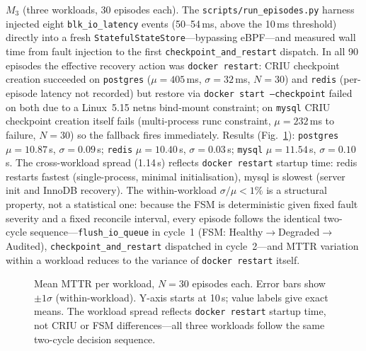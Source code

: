 \documentclass[conference]{IEEEtran}
\begin{document}
$M_3$ (three workloads, 30 episodes each). The \texttt{scripts/run\_episodes.py} harness injected eight \texttt{blk\_io\_latency} events (50--54\,ms, above the 10\,ms threshold) directly into a fresh \texttt{StatefulStateStore}---bypassing eBPF---and measured wall time from fault injection to the first \texttt{checkpoint\_and\_restart} dispatch. In all 90 episodes the effective recovery action was \texttt{docker restart}: CRIU checkpoint creation succeeded on \texttt{postgres} ($\mu = 405$\,ms, $\sigma = 32$\,ms, $N=30$) and \texttt{redis} (per-episode latency not recorded) but restore via \texttt{docker start --checkpoint} failed on both due to a Linux~5.15 netns bind-mount constraint; on \texttt{mysql} CRIU checkpoint creation itself fails (multi-process runc constraint, $\mu = 232$\,ms to failure, $N=30$) so the fallback fires immediately. Results (Fig.~\ref{fig:mttr}): \texttt{postgres} $\mu = 10.87$\,s, $\sigma = 0.09$\,s; \texttt{redis} $\mu = 10.40$\,s, $\sigma = 0.03$\,s; \texttt{mysql} $\mu = 11.54$\,s, $\sigma = 0.10$\,s. The cross-workload spread (1.14\,s) reflects \texttt{docker restart} startup time: redis restarts fastest (single-process, minimal initialisation), mysql is slowest (server init and InnoDB recovery). The within-workload $\sigma/\mu < 1\%$ is a structural property, not a statistical one: because the FSM is deterministic given fixed fault severity and a fixed reconcile interval, every episode follows the identical two-cycle sequence---\texttt{flush\_io\_queue} in cycle~1 (FSM: Healthy$\rightarrow$Degraded$\rightarrow$Audited), \texttt{checkpoint\_and\_restart} dispatched in cycle~2---and MTTR variation within a workload reduces to the variance of \texttt{docker restart} itself.

\begin{figure}[!t]
\centering
{}
\caption{Mean MTTR per workload, $N=30$ episodes each. Error bars show $\pm1\sigma$ (within-workload). Y-axis starts at 10\,s; value labels give exact means. The workload spread reflects \texttt{docker restart} startup time, not CRIU or FSM differences---all three workloads follow the same two-cycle decision sequence.}
\label{fig:mttr}
\end{figure}
\end{document}
